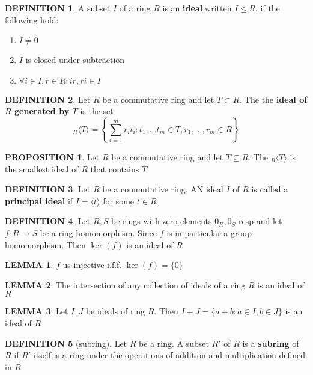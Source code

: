 \documentclass[12pt]{article}
\theoremstyle{definition}
\newtheorem{definition}{DEFINITION}[subsection]
\newtheorem{lemma}{LEMMA}[subsection]
\newtheorem{prop}{PROPOSITION}[subsection]
\begin{document}
\begin{definition}
    A subset $I$ of a ring $R$ is an \textbf{ideal},written $I \trianglelefteq R$, if the following hold:
    \begin{enumerate}
        \item $I \neq 0$
        \item $I$ is closed under subtraction
        \item $\forall i \in I, r\in R: ir,ri\in I$
    \end{enumerate} 
\end{definition}

\begin{definition}
    Let $R$ be a commutative ring and let $T \subset R$. The the \textbf{ideal of $R$ generated by $T$} is the set
    $$_R\langle T\rangle = \left\{\sum_{i=1}^m{r_it_i}: t_1,...t_m\in T, r_1,...,r_m \in R\right\}$$
\end{definition}

\begin{prop}
    Let $R$ be a commutative ring and let $T \subseteq R$. The $_R\langle T \rangle$ is the smallest ideal of $R$ that contains $T$
\end{prop}

\begin{definition}
    Let $R$ be a commutative ring. AN ideal $I$ of $R$ is called a \textbf{principal ideal} if $I = \langle t \rangle$ for some $t \in R$
\end{definition}

\begin{definition}
    Let $R,S$ be rings with zero elements $0_R,0_S$ resp and let $f:R\rightarrow S$ be a ring homomorphism. Since $f$ is in particular a group homomorphism. Then $\ker(f)$ is an ideal of $R$
\end{definition}

\begin{lemma}
    $f$ us injective i.f.f. $\ker(f) = \{0\}$
\end{lemma}

\begin{lemma}
    The intersection of any collection of ideals of a ring $R$ is an ideal of $R$
\end{lemma}

\begin{lemma}
    Let $I,J$ be ideals of ring $R$. Then $I+J = \{a+b:a\in I, b\in J\}$ is an ideal of $R$
\end{lemma}

\begin{definition}[subring]
    Let $R$ be a ring. A subset $R'$ of $R$ is a \textbf{subring} of $R$ if $R'$ itself is a ring under the operations of addition and multiplication defined in $R$
\end{definition}
\end{document}
